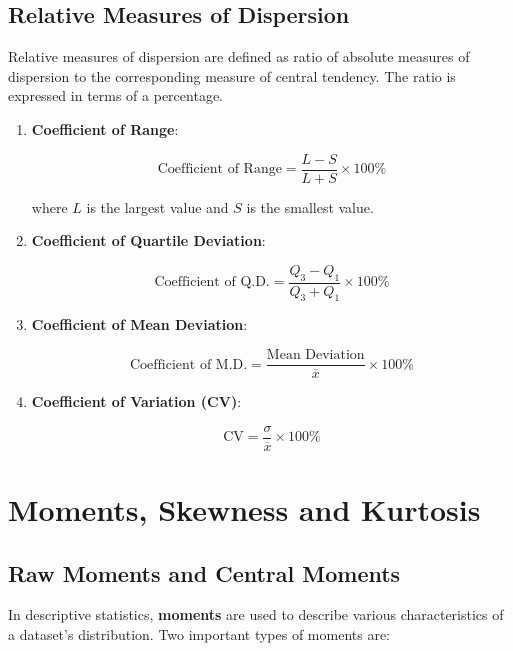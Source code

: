 \documentclass[twoside]{book}
\begin{document}
\subsection{Relative Measures of Dispersion}

Relative measures of dispersion are defined as ratio of absolute measures of dispersion to the corresponding measure of central tendency. The ratio is expressed in terms of a percentage.

\begin{enumerate}
    \item \textbf{Coefficient of Range}:
    \begin{textbox}
    \[
    \text{Coefficient of Range} = \frac{L - S}{L + S}\times 100\%
    \]
    \end{textbox}
    where \( L \) is the largest value and \( S \) is the smallest value.

    \item \textbf{Coefficient of Quartile Deviation}:
    \begin{textbox}
    \[
    \text{Coefficient of Q.D.} = \frac{Q_3 - Q_1}{Q_3 + Q_1}\times 100\%
    \]
    \end{textbox}

    \item \textbf{Coefficient of Mean Deviation}:
    \begin{textbox}
    \[
    \text{Coefficient of M.D.} = \frac{\text{Mean Deviation}}{\overline{x}}\times 100\%
    \]
    \end{textbox}

    \item \textbf{Coefficient of Variation (CV)}:
    \begin{textbox}
    \[
    \text{CV} = \frac{\sigma}{\overline{x}} \times 100\%
    \]
    \end{textbox}
\end{enumerate}

\section{Moments, Skewness and Kurtosis}

\subsection{Raw Moments and Central Moments}

In descriptive statistics, \textbf{moments} are used to describe various characteristics of a dataset's distribution. Two important types of moments are:
\end{document}
